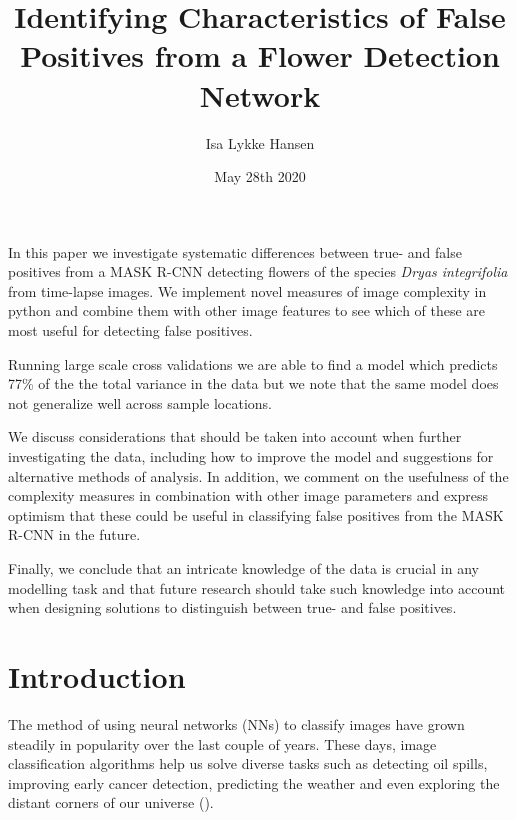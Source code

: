 \documentclass[12pt]{article}
\title{Identifying Characteristics of False Positives from a Flower Detection Network}
\author{Isa Lykke Hansen}
\date{May 28th 2020}
\begin{document}
\onehalfspacing

\begin{titlepage}
	\maketitle
	\newpage
\end{titlepage}

\abstract{}

In this paper we investigate systematic differences between true- and false positives from a MASK R-CNN detecting flowers of the species \textit{Dryas integrifolia} from time-lapse images. We implement novel measures of image complexity in python and combine them with other image features to see which of these are most useful for detecting false positives.

Running large scale cross validations we are able to find a model which predicts 77\% of the the total variance in the data but we note that the same model does not generalize well across sample locations. 

We discuss considerations that should be taken into account when further investigating the data, including how to improve the model and suggestions for alternative methods of analysis. In addition, we comment on the usefulness of the complexity measures in combination with other image parameters and express optimism that these could be useful in classifying false positives from the MASK R-CNN in the future.

Finally, we conclude that an intricate knowledge of the data is crucial in any modelling task and that future research should take such knowledge into account when designing solutions to distinguish between true- and false positives.

\clearpage
\tableofcontents
\clearpage

\section{Introduction}
The method of using neural networks (NNs) to classify images have grown steadily in popularity over the last couple of years. These days, image classification algorithms help us solve diverse tasks such as detecting oil spills, improving early cancer detection, predicting the weather and even exploring the distant corners of our universe (\cite{vestfalenAarhusHeleByen2019,ekiciBreastCancerDiagnosis2020,abhishekWeatherForecastingModel2012,krastevRealtimeDetectionGravitational2020}).
\end{document}
